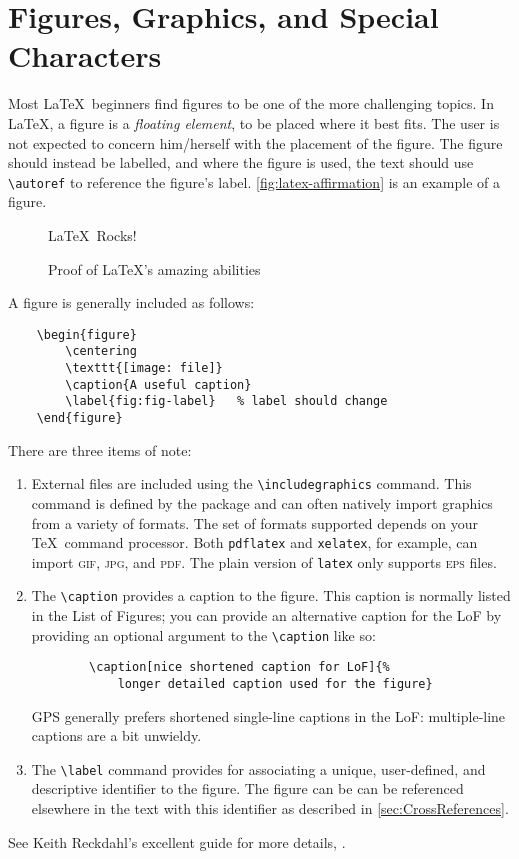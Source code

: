 \section{Figures, Graphics, and Special Characters}
\label{sec:Graphics}

Most \LaTeX\ beginners find figures to be one of the more challenging
topics.  In \LaTeX, a figure is a \emph{floating element}, to be
placed where it best fits.
The user is not expected to concern him/herself with the placement
of the figure.  The figure should instead be labelled, and where
the figure is used, the text should use \verb+\autoref+ to reference
the figure's label.
\autoref{fig:latex-affirmation} is an example of a figure.
\begin{figure}
	\centering
	\Huge{\textsf{\LaTeX\ Rocks!}}
	\caption{Proof of \LaTeX's amazing abilities}
	\label{fig:latex-affirmation}   %
\end{figure}
A figure is generally included as follows:
\begin{lstlisting}
	\begin{figure}
		\centering
		\texttt{[image: file]}
		\caption{A useful caption}
		\label{fig:fig-label}   % label should change
	\end{figure}
\end{lstlisting}
There are three items of note:
\begin{enumerate}
	\item External files are included using the \verb+\includegraphics+
	command.  This command is defined by the  package
	and can often natively import graphics from a variety of formats.
	The set of formats supported depends on your \TeX\ command processor.
	Both \texttt{pdflatex} and \texttt{xelatex}, for example, can
	import \textsc{gif}, \textsc{jpg}, and \textsc{pdf}.  The plain
	version of \texttt{latex} only supports \textsc{eps} files.
	
	\item The \verb+\caption+ provides a caption to the figure. 
	This caption is normally listed in the List of Figures; you
	can provide an alternative caption for the LoF by providing
	an optional argument to the \verb+\caption+ like so:
	\begin{lstlisting}
		\caption[nice shortened caption for LoF]{%
			longer detailed caption used for the figure}
	\end{lstlisting}
	\ac{GPS} generally prefers shortened single-line captions
	in the LoF: multiple-line captions are a bit unwieldy.
	
	\item The \verb+\label+ command provides for associating a unique, user-defined,
	and descriptive identifier to the figure.  The figure can be
	can be referenced elsewhere in the text with this identifier
	as described in \autoref{sec:CrossReferences}.
\end{enumerate}
See Keith Reckdahl’s excellent guide for more details,
.

